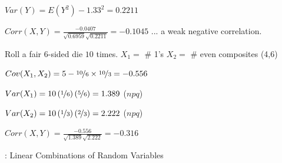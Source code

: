 $ Var(Y)=E(Y^2)-1.33^2=0.2211 $

$ Corr(X,Y)=\frac{-0.0407}{\sqrt{0.6959}\sqrt{0.2211}}=-0.1045 $ ... a weak
negative correlation.


Roll a fair $6$-sided die $ 10 $ times.
$ X_1= $ \# 1's
$ X_2= $ \# even composites (4,6)

$ Cov(X_1,X_2)=5-\nicefrac{10}{6}\times \nicefrac{10}{3}=-0.556 $

$ Var(X_1)=10\left( \nicefrac{1}{6} \right)\left( \nicefrac{5}{6} \right)=1.389 $ ($ npq $)

$ Var(X_2)=10\left( \nicefrac{1}{3} \right)\left( \nicefrac{2}{3} \right)=2.222 $ ($ npq $)

$ Corr(X,Y)=\frac{-0.556}{\sqrt{1.389}\sqrt{2.222}}=-0.316 $

: Linear Combinations of Random Variables